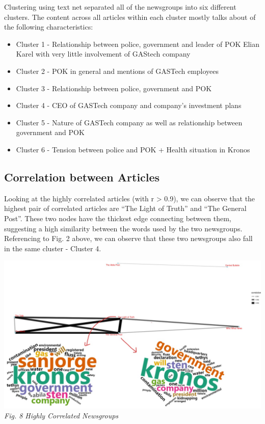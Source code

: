 \documentclass{acm_proc_article-sp}
\providecommand{\tightlist}{%
  \setlength{\itemsep}{0pt}\setlength{\parskip}{0pt}}
\begin{document}
Clustering using text net separated all of the newsgroups into six
different clusters. The content across all articles within each cluster
mostly talks about of the following characteristics:

\begin{itemize}
\tightlist
\item
  Cluster 1 - Relationship between police, government and leader of POK
  Elian Karel with very little involvement of GAStech company
\item
  Cluster 2 - POK in general and mentions of GASTech employees
\item
  Cluster 3 - Relationship between police, government and POK
\item
  Cluster 4 - CEO of GASTech company and company's investment plans
\item
  Cluster 5 - Nature of GASTech company as well as relationship between
  government and POK
\item
  Cluster 6 - Tension between police and POK + Health situation in
  Kronos
\end{itemize}

\hypertarget{correlation-between-articles}{%
\subsection{Correlation between
Articles}\label{correlation-between-articles}}

Looking at the highly correlated articles (with r \textgreater{} 0.9),
we can observe that the highest pair of correlated articles are ``The
Light of Truth'' and ``The General Post''. These two nodes have the
thickest edge connecting between them, suggesting a high similarity
between the words used by the two newsgroups. Referencing to Fig. 2
above, we can observe that these two newsgroups also fall in the same
cluster - Cluster 4.

\includegraphics{img/image16.jpg} \emph{Fig. 8 Highly Correlated
Newsgroups}
\end{document}
